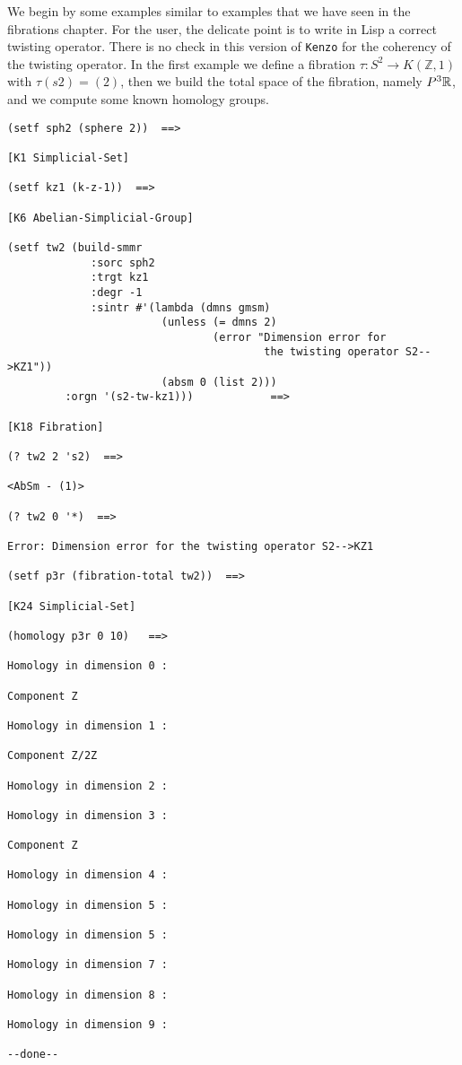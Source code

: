 We begin by some examples similar to examples that we have seen in the fibrations chapter.
For the user, the delicate point is to write in Lisp a correct twisting operator. There is no check
in this version of {\tt Kenzo} for the coherency of the twisting operator. In the first example
we define a fibration $\tau: S^2 \rightarrow K(\mathbb{Z},1)$ with $\tau(s2)= (2)$, then we build the
total space of the fibration, namely $P^3{{\mathbb{R}}}$, and we compute some known homology groups.
{\footnotesize\begin{verbatim}
(setf sph2 (sphere 2))  ==>

[K1 Simplicial-Set]

(setf kz1 (k-z-1))  ==>

[K6 Abelian-Simplicial-Group]

(setf tw2 (build-smmr
             :sorc sph2
             :trgt kz1
             :degr -1
             :sintr #'(lambda (dmns gmsm)
                        (unless (= dmns 2)
                                (error "Dimension error for
                                        the twisting operator S2-->KZ1"))
                        (absm 0 (list 2)))
	     :orgn '(s2-tw-kz1)))            ==>

[K18 Fibration]

(? tw2 2 's2)  ==>

<AbSm - (1)>

(? tw2 0 '*)  ==>

Error: Dimension error for the twisting operator S2-->KZ1

(setf p3r (fibration-total tw2))  ==>

[K24 Simplicial-Set]

(homology p3r 0 10)   ==>

Homology in dimension 0 :

Component Z

Homology in dimension 1 :

Component Z/2Z

Homology in dimension 2 :

Homology in dimension 3 :

Component Z

Homology in dimension 4 :

Homology in dimension 5 :

Homology in dimension 5 :

Homology in dimension 7 :

Homology in dimension 8 :

Homology in dimension 9 :

--done--
\end{verbatim}}
